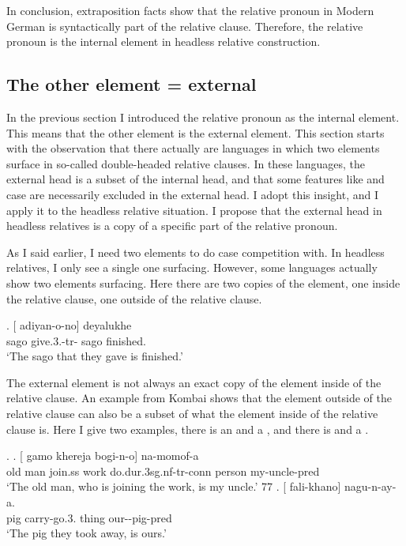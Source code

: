  In conclusion, extraposition facts show that the relative pronoun in Modern German is syntactically part of the relative clause. Therefore, the relative pronoun is the internal element in headless relative construction.


 \subsection{The other element = external}\label{sec:external-element}

 In the previous section I introduced the relative pronoun as the internal element. This means that the other element is the external element. This section starts with the observation that there actually are languages in which two elements surface in so-called double-headed relative clauses. In these languages, the external head is a subset of the internal head, and that some features like  and case are necessarily excluded in the external head. I adopt this insight, and I apply it to the headless relative situation. I propose that the external head in headless relatives is a copy of a specific part of the relative pronoun.%

 As I said earlier, I need two elements to do case competition with. In headless relatives, I only see a single one surfacing. However, some languages actually show two elements surfacing. Here there are two copies of the element, one inside the relative clause, one outside of the relative clause.

 \exg. [ adiyan-o-no]  deyalukhe\\
  sago give.3.-{tr}- sago finished.\\
  `The sago that they gave is finished.' 

 The external element is not always an exact copy of the element inside of the relative clause. An example from Kombai shows that the element outside of the relative clause can also be a subset of what the element inside of the relative clause is. Here I give two examples, there is an  and a , and there is  and a .

 \ex.
 \ag. [ gamo khereja bogi-n-o]  na-momof-a\\
  {old man} join.\ac{ss} work do.\ac{dur}.3\ac{sg}.\ac{nf}-\ac{tr}-\ac{conn} person my-uncle-\ac{pred}\\
  `The old man, who is joining the work, is my uncle.' 77
 \bg. [ fali-khano]  nagu-n-ay-a.\\
  pig carry-go.3. thing our--pig-\ac{pred}\\
  `The pig they took away, is ours.' 


